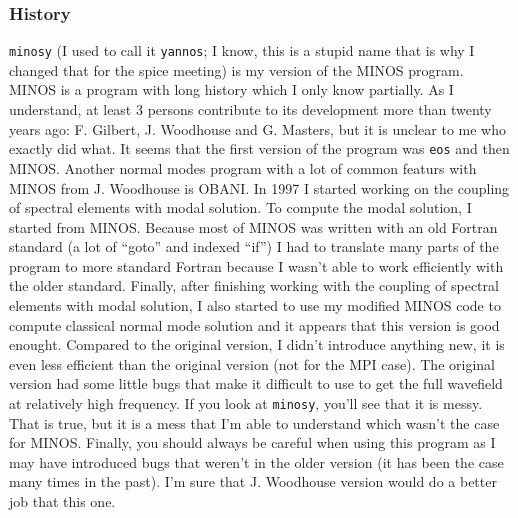 \documentclass[11pt]{article}
\begin{document}
\subsubsection{History}
{\tt minosy} (I used to call it {\tt yannos}; I know, this is a stupid name
that is why I changed that for the spice meeting) is my version of the
MINOS program. MINOS is a program with long history which I only know
partially. As I understand, at least 3 persons contribute to its
development more than twenty years ago: F. Gilbert,  
J. Woodhouse and G. Masters, but it is unclear to me who exactly did
what. It seems that the first version of the program was {\tt eos} and
then MINOS. Another normal modes  program with a lot of common featurs
with MINOS from J. Woodhouse is OBANI. In 1997 I started working on the coupling of spectral elements
with  modal  solution. To compute the modal solution, I started  from 
MINOS.  Because most of MINOS was written with an old
Fortran standard (a lot of ``goto'' and indexed ``if'') I had to
translate many parts of the program to more standard Fortran because
I wasn't able to work efficiently with the older standard. Finally,
after finishing working with the coupling of spectral elements
with  modal  solution, I also started to use my modified MINOS code
to compute classical normal mode solution and it appears that this
version is good enought. Compared to the original
version, I didn't introduce anything new, it is even less efficient
than the original version (not for the MPI case). The original version
had some little bugs that make it difficult to use to get the full wavefield 
at relatively high frequency. If you look at {\tt minosy},
you'll see that it is messy. That is true, but it is a mess that I'm
able to understand which wasn't the case for MINOS. Finally, you
should always be careful when using this program as I may have
introduced bugs that weren't in the older version (it has been the case
many times in the past). I'm sure that J. Woodhouse version would do a
better job that this one.
\end{document}
